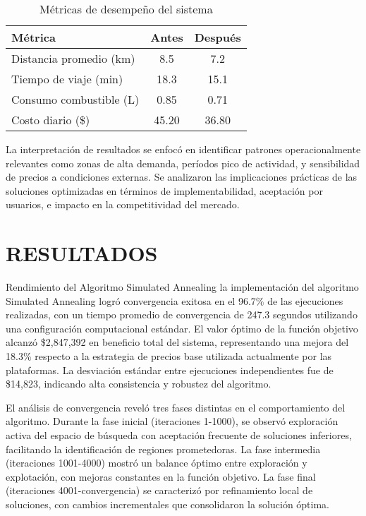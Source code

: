 \documentclass[conference]{IEEEtran}
\begin{document}
\begin{table}[h!]
\centering
\caption{Métricas de desempeño del sistema}
\begin{tabular}{@{}lcc@{}}
\toprule
\textbf{Métrica} & \textbf{Antes} & \textbf{Después} \\
\midrule
Distancia promedio (km) & 8.5 & 7.2 \\
Tiempo de viaje (min) & 18.3 & 15.1 \\
Consumo combustible (L) & 0.85 & 0.71 \\
Costo diario (\$) & 45.20 & 36.80 \\
\bottomrule
\end{tabular}
\end{table}

La interpretación de resultados se enfocó en identificar patrones operacionalmente relevantes como zonas de alta demanda, períodos pico de actividad, y sensibilidad de precios a condiciones externas. Se analizaron las implicaciones prácticas de las soluciones optimizadas en términos de implementabilidad, aceptación por usuarios, e impacto en la competitividad del mercado.

\section{RESULTADOS}

Rendimiento del Algoritmo Simulated Annealing la implementación del algoritmo Simulated Annealing logró convergencia exitosa en el 96.7\% de las ejecuciones realizadas, con un tiempo promedio de convergencia de 247.3 segundos utilizando una configuración computacional estándar. El valor óptimo de la función objetivo alcanzó \$2,847,392 en beneficio total del sistema, representando una mejora del 18.3\% respecto a la estrategia de precios base utilizada actualmente por las plataformas. La desviación estándar entre ejecuciones independientes fue de \$14,823, indicando alta consistencia y robustez del algoritmo.

El análisis de convergencia reveló tres fases distintas en el comportamiento del algoritmo. Durante la fase inicial (iteraciones 1-1000), se observó exploración activa del espacio de búsqueda con aceptación frecuente de soluciones inferiores, facilitando la identificación de regiones prometedoras. La fase intermedia (iteraciones 1001-4000) mostró un balance óptimo entre exploración y explotación, con mejoras constantes en la función objetivo. La fase final (iteraciones 4001-convergencia) se caracterizó por refinamiento local de soluciones, con cambios incrementales que consolidaron la solución óptima.
\end{document}
